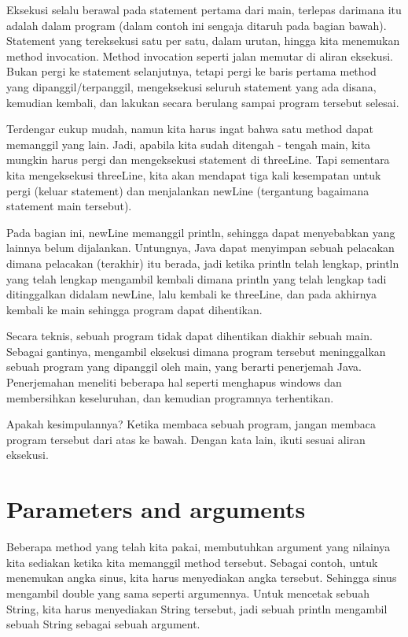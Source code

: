 Eksekusi selalu berawal pada statement pertama dari main, terlepas darimana itu adalah dalam program (dalam contoh ini sengaja ditaruh pada bagian bawah). Statement yang tereksekusi satu per satu, dalam urutan, hingga kita menemukan method invocation. Method invocation seperti jalan memutar di aliran eksekusi. Bukan pergi ke statement selanjutnya, tetapi pergi ke baris pertama method yang dipanggil/terpanggil, mengeksekusi seluruh statement yang ada disana, kemudian kembali, dan lakukan secara berulang sampai program tersebut selesai.

Terdengar cukup mudah, namun kita harus ingat bahwa satu method dapat memanggil yang lain. Jadi, apabila kita sudah ditengah - tengah main, kita mungkin harus pergi dan mengeksekusi statement di threeLine. Tapi sementara kita mengeksekusi threeLine, kita akan mendapat tiga kali kesempatan untuk pergi (keluar statement) dan menjalankan newLine (tergantung bagaimana statement main tersebut).

Pada bagian ini, newLine memanggil println, sehingga dapat menyebabkan yang lainnya belum dijalankan. Untungnya, Java dapat menyimpan sebuah pelacakan dimana pelacakan (terakhir) itu berada, jadi ketika println telah lengkap, println yang telah lengkap mengambil kembali dimana println yang telah lengkap tadi ditinggalkan didalam newLine, lalu kembali ke threeLine, dan pada akhirnya kembali ke main sehingga program dapat dihentikan.

Secara teknis, sebuah program tidak dapat dihentikan diakhir sebuah main. Sebagai gantinya, mengambil eksekusi dimana program tersebut meninggalkan sebuah program yang dipanggil oleh main, yang berarti penerjemah Java. Penerjemahan meneliti beberapa hal seperti menghapus windows dan membersihkan keseluruhan, dan kemudian programnya terhentikan.

Apakah kesimpulannya? Ketika membaca sebuah program, jangan membaca program tersebut dari atas ke bawah. Dengan kata lain, ikuti sesuai aliran eksekusi.

\section{Parameters and arguments} 
Beberapa method yang telah kita pakai, membutuhkan argument yang nilainya kita sediakan ketika kita memanggil method tersebut. Sebagai contoh, untuk menemukan angka sinus, kita harus menyediakan angka tersebut. Sehingga sinus mengambil double yang sama seperti argumennya. Untuk mencetak sebuah String, kita harus menyediakan String tersebut, jadi sebuah println mengambil sebuah String sebagai sebuah argument. 


